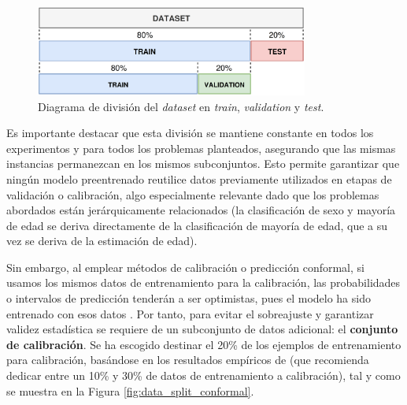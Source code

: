 \begin{figure}[h]
    \centering
    \includegraphics[width=0.8\textwidth]{capitulos/cap_04/imagenes/data_split_base.png}
    \caption[
        Diagrama de división del \textit{dataset} en \textit{train}, \textit{validation} y \textit{test}.
    ]{
        Diagrama de división del \textit{dataset} en \textit{train}, \textit{validation} y \textit{test}. 
    } 
    \label{fig:data_split_base}
\end{figure}

Es importante destacar que esta división se mantiene constante en todos los experimentos y para todos los problemas planteados, asegurando que las mismas instancias permanezcan en los mismos subconjuntos. Esto permite garantizar que ningún modelo preentrenado reutilice datos previamente utilizados en etapas de validación o calibración, algo especialmente relevante dado que los problemas abordados están jerárquicamente relacionados (la clasificación de sexo y mayoría de edad se deriva directamente de la clasificación de mayoría de edad, que a su vez se deriva de la estimación de edad).

Sin embargo, al emplear métodos de calibración o predicción conformal, si usamos los mismos datos de entrenamiento para la calibración, las probabilidades o intervalos de predicción tenderán a ser optimistas, pues el modelo ha sido entrenado con esos datos \cite{niculescu2005}. Por tanto, para evitar el sobreajuste y garantizar validez estadística se requiere de un subconjunto de datos adicional: el \textbf{conjunto de calibración}. Se ha escogido destinar el  20\% de los ejemplos de entrenamiento para calibración, basándose en los resultados empíricos de \cite{sesia2020} (que recomienda dedicar entre un 10\% y 30\% de datos de entrenamiento a calibración), tal y como se muestra en la Figura \ref{fig:data_split_conformal}.

